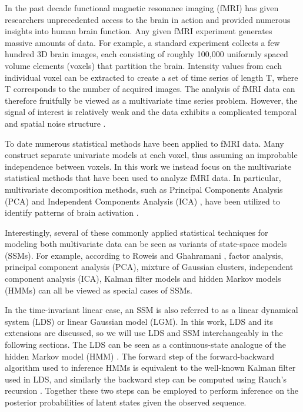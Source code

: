 \documentclass[fleqn]{article}
\begin{document}
 In the past decade functional magnetic resonance imaging (fMRI) has given researchers unprecedented access to the brain in action and provided numerous insights into human brain function. Any given fMRI experiment generates massive amounts of data. For example, a standard experiment collects a few hundred 3D brain images, each consisting of roughly 100,000 uniformly spaced volume elements (voxels) that partition the brain. Intensity values from each individual voxel can be extracted to create a set of time series of length T, where T corresponds to the number of acquired images. The analysis of fMRI data can therefore fruitfully be viewed as a multivariate time series problem. However, the signal of interest is relatively weak and the data exhibits a complicated temporal and spatial noise structure \cite{lindquist2008statistical}.

To date numerous statistical methods have been applied to fMRI data. Many construct separate univariate models at each voxel, thus assuming an improbable independence between voxels. In this work we instead focus on the multivariate statistical methods that have been used to analyze fMRI data. In particular, multivariate decomposition methods, such as Principal Components Analysis (PCA) \cite{andersen1999principal} and Independent Components Analysis (ICA) \cite{calhoun2009review}, have been utilized to identify patterns of brain activation \cite{mckeown1998spatially}.

Interestingly, several of these commonly applied statistical techniques for modeling both multivariate data can be seen as variants of state-space models (SSMs). For example, according to Roweis and Ghahramani \cite{roweis1999unifying}, factor analysis, principal component analysis (PCA), mixture of Gaussian clusters, independent component analysis (ICA), Kalman filter models and hidden Markov models (HMMs) can all be viewed as special cases of SSMs.

In the time-invariant linear case, an SSM is also referred to as a linear dynamical system (LDS) or linear Gaussian model (LGM). In this work, LDS and its extensions are discussed, so we will use LDS and SSM interchangeably in the following sections. The LDS can be seen as a continuous-state analogue of the hidden Markov model (HMM) \cite{rabiner1986introduction}. The forward step of the forward-backward algorithm used to inference HMMs is equivalent to the well-known Kalman filter used in LDS, and similarly the backward step can be computed using Rauch’s recursion \cite{rauch1963solutions}. Together these two steps can be employed to perform inference on the posterior probabilities of latent states given the observed sequence.
\end{document}
